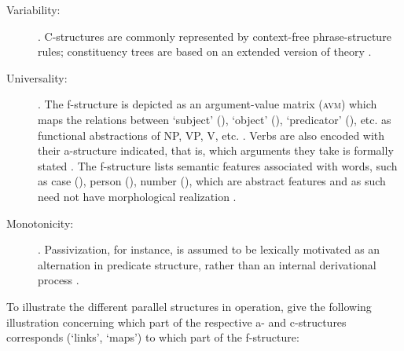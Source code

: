 \begin{description}
\item[Variability:] . 
C-structures are commonly represented by context-free phrase-structure rules; 
constituency trees are based on an extended version of  theory 
\citep[42]{bresnan2016}.

\item[Universality:] . The f-structure is depicted 
as an argument-value matrix (\textsc{avm}) which maps the relations between 
`subject' (\Subj{}), `object' (\Obj{}), `predicator' (\Pred{}), etc. as 
functional abstractions of NP, VP, V, etc. \citep[42]{bresnan2016}. Verbs are 
also encoded with their a-structure indicated, that is, which arguments they 
take is formally stated \citep[15]{bresnan2016}. The f-structure lists semantic 
features associated with words, such as case (\Case{}), person (\Pers{}), 
number (\Num{}), which are abstract features and as such need not 
have morphological realization \citep[43]{bresnan2016}.

\item[Monotonicity:] . Passivization, for instance, is assumed to be lexically motivated 
as an alternation in predicate structure, rather than an internal derivational 
process \citep[23\psqq]{bresnan2016}.

\end{description}

To illustrate the different parallel structures in operation, 
\citet[15]{bresnan2016} give the following illustration concerning which part of 
the respective a- and c-structures corresponds (`links', `maps') to which part 
of the f-structure:

